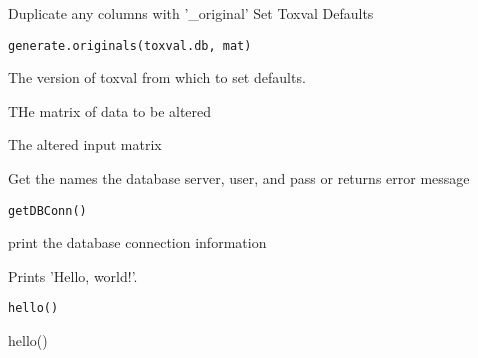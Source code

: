\documentclass[letterpaper]{book}
\begin{document}
%
\begin{Description}\relax
Duplicate any columns with '\_original'
Set Toxval Defaults
\end{Description}
%
\begin{Usage}
\begin{verbatim}
generate.originals(toxval.db, mat)
\end{verbatim}
\end{Usage}
%
\begin{Arguments}
\begin{ldescription}
\item[\code{toxval.db}] The version of toxval from which to set defaults.

\item[\code{mat}] THe matrix of data to be altered
\end{ldescription}
\end{Arguments}
%
\begin{Value}
The altered input matrix
\end{Value}
%
\begin{Description}\relax
Get the names the database server, user, and pass or returns error message
\end{Description}
%
\begin{Usage}
\begin{verbatim}
getDBConn()
\end{verbatim}
\end{Usage}
%
\begin{Value}
print the database connection information
\end{Value}
%
\begin{Description}\relax
Prints 'Hello, world!'.
\end{Description}
%
\begin{Usage}
\begin{verbatim}
hello()
\end{verbatim}
\end{Usage}
%
\begin{Examples}
\begin{ExampleCode}
hello()
\end{ExampleCode}
\end{Examples}
\end{document}

